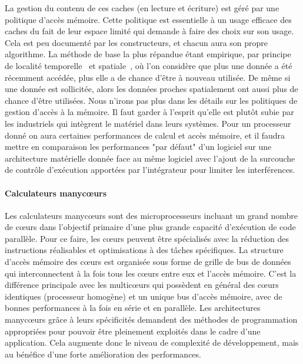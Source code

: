 \documentclass[french, a4paper, 11pt, twoside, pdftex]{StyleThese}
\begin{document}
		La gestion du contenu de ces caches (en lecture et écriture) est géré par une politique d'accès mémoire. Cette politique est essentielle à un usage efficace des caches du fait de leur espace limité qui demande à faire des choix sur son usage. Cela est peu documenté par les constructeurs, et chacun aura son propre algorithme.
		La méthode de base la plus répandue étant empirique, par principe de localité temporelle~\cite{durrieu_predictable_2014} et spatiale~\cite{wilkes_slave_1965}, où l'on considère que plus une donnée a été récemment accédée, plus elle a de chance d'être à nouveau utilisée. De même si une donnée est sollicitée, alors les données proches spatialement ont aussi plus de chance d'être utilisées. 
		Nous n'irons pas plus dans les détails sur les politiques de gestion d'accès à la mémoire. Il faut garder à l'esprit qu'elle est plutôt subie par les industriels qui intègrent le matériel dans leurs systèmes. Pour un processeur donné on aura certaines performances de calcul et accès mémoire, et il faudra mettre en comparaison les performances "par défaut" d'un logiciel sur une architecture matérielle donnée face au même logiciel avec l'ajout de la surcouche de contrôle d'exécution apportées par l'intégrateur pour limiter les interférences.


		\paragraph{Calculateurs manycœurs}	Les calculateurs manycœurs sont des microprocesseurs incluant un grand nombre de cœurs dans l'objectif primaire d'une plus grande capacité d'exécution de code parallèle. Pour ce faire, les cœurs peuvent être spécialisés avec la réduction des instructions réalisables et optimisations à des tâches spécifiques. La structure d'accès mémoire des cœurs est organisée sous forme de grille de bus de données qui interconnectent à la fois tous les cœurs entre eux et l'accès mémoire. C'est la différence principale avec les multicœurs qui possèdent en général des cœurs identiques (processeur homogène) et un unique bus d'accès mémoire, avec de bonnes performances à la fois en série et en parallèle. 
		Les architectures manycœurs grâce à leurs spécificités demandent  des méthodes de programmation appropriées pour pouvoir être pleinement exploités dans le cadre d'une application. Cela augmente donc le niveau de complexité de développement, mais au bénéfice d'une forte amélioration des performances.
		
\end{document}
